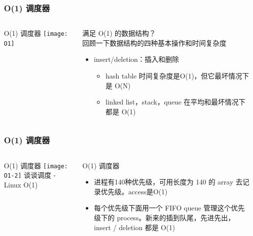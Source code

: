 \begin{frame}
	\frametitle{ O(1) 调度器}
	\begin{columns}
		\begin{column}{.4\textwidth}
			\Large \centering
			O(1) 调度器
			\texttt{[image: O1]}
			
		\end{column}
		
		\begin{column}{.6\textwidth}
			满足 O(1) 的数据结构？\\
			回顾一下数据结构的四种基本操作和时间复杂度
			\begin{itemize}
				\item insert/deletion：插入和删除
				\begin{itemize}
					\item hash table 时间复杂度是O(1)，但它最坏情况下是 O(N) 
					\item linked list，stack，queue 在平均和最坏情况下都是 O(1)
				\end{itemize}
			\end{itemize}
		\end{column}
	\end{columns}
\end{frame}



\begin{frame}
	\frametitle{ O(1) 调度器}
	\begin{columns}
		\begin{column}{.6\textwidth}
			\Large \centering
			O(1) 调度器
			\texttt{[image: O1-2]}
			谈谈调度 - Linux O(1)
		\end{column}
		
		\begin{column}{.4\textwidth}
			O(1) 调度器\\
			
			\begin{itemize}
				\item 进程有140种优先级，可用长度为 140 的 array 去记录优先级。access是O(1)

				\item 每个优先级下面用一个 FIFO queue 管理这个优先级下的 process。新来的插到队尾，先进先出，insert / deletion 都是 O(1)

			\end{itemize}
		\end{column}
	\end{columns}
\end{frame}

